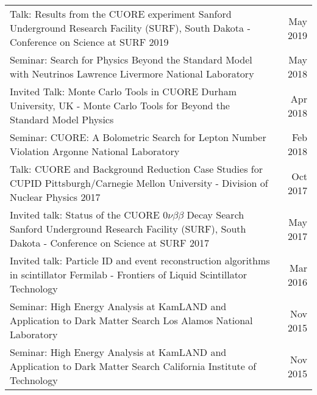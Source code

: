 \documentclass[11pt]{article} %
\begin{document}
\noindent\begin{tabularx}{\linewidth}{@{{}\textbullet\enskip}X@{\quad}r@{}}
Talk: Results from the CUORE experiment \newline Sanford Underground Research Facility (SURF), South Dakota - Conference on Science at SURF 2019 & May 2019\\

\addlinespace[5pt]
Seminar: Search for Physics Beyond the Standard Model with Neutrinos \newline Lawrence Livermore National Laboratory & May  2018\\

\addlinespace[5pt]
Invited Talk: Monte Carlo Tools in CUORE \newline Durham University, UK - Monte Carlo Tools for Beyond the Standard Model Physics & Apr 2018 \\

\addlinespace[5pt]
Seminar: CUORE: A Bolometric Search for Lepton Number Violation \newline Argonne National Laboratory & Feb 2018 \\

\addlinespace[5pt]
Talk: CUORE and Background Reduction Case Studies for CUPID \newline Pittsburgh/Carnegie Mellon University - Division of Nuclear Physics 2017 & Oct 2017 \\

\addlinespace[5pt]
Invited talk: Status of the CUORE $0\nu\beta\beta$ Decay Search \newline Sanford Underground Research Facility (SURF), South Dakota - Conference on Science at SURF 2017 & May 2017 \\

\addlinespace[5pt]
Invited talk: Particle ID and event reconstruction algorithms in scintillator \newline Fermilab - Frontiers of Liquid Scintillator Technology & Mar 2016 \\

\addlinespace[5pt]
Seminar: High Energy Analysis at KamLAND and Application to Dark Matter Search \newline Los Alamos National Laboratory & Nov 2015 \\

\addlinespace[5pt]
Seminar: High Energy Analysis at KamLAND and Application to Dark Matter Search \newline California Institute of Technology & Nov 2015 \\


\end{tabularx}
\end{document}
